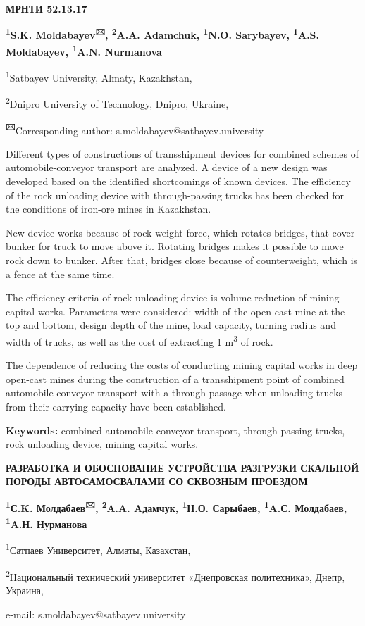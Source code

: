 \newpage
{\bfseries МРНТИ 52.13.17}


\begin{center}
{\bfseries \textsuperscript{1}S.K. Moldabayev\textsuperscript{🖂}, \textsuperscript{2}A.A. Adamchuk, \textsuperscript{1}N.O. Sarybayev, \textsuperscript{1}A.S. Moldabayev, \textsuperscript{1}A.N. Nurmanova}

\textsuperscript{1}Satbayev University, Almaty, Kazakhstan,

\textsuperscript{2}Dnipro University of Technology, Dnipro, Ukraine,

{\bfseries \textsuperscript{🖂}}Corresponding author:
s.moldabayev@satbayev.university
\end{center}

Different types of constructions of transshipment devices for combined
schemes of automobile-conveyor transport are analyzed. A device of a new
design was developed based on the identified shortcomings of known
devices. The efficiency of the rock unloading device with
through-passing trucks has been checked for the conditions of iron-ore
mines in Kazakhstan.

New device works because of rock weight force, which rotates bridges,
that cover bunker for truck to move above it. Rotating bridges makes it
possible to move rock down to bunker. After that, bridges close because
of counterweight, which is a fence at the same time.

The efficiency criteria of rock unloading device is volume reduction of
mining capital works. Parameters were considered: width of the open-cast
mine at the top and bottom, design depth of the mine, load capacity,
turning radius and width of trucks, as well as the cost of extracting 1
m\textsuperscript{3} of rock.

The dependence of reducing the costs of conducting mining capital works
in deep open-cast mines during the construction of a transshipment point
of combined automobile-conveyor transport with a through passage when
unloading trucks from their carrying capacity have been established.

{\bfseries Keywords:} combined automobile-conveyor transport,
through-passing trucks, rock unloading device, mining capital works.

\begin{center}
{\large\bfseries РАЗРАБОТКА И ОБОСНОВАНИЕ УСТРОЙСТВА РАЗГРУЗКИ СКАЛЬНОЙ ПОРОДЫ
АВТОСАМОСВАЛАМИ СО СКВОЗНЫМ ПРОЕЗДОМ}

{\bfseries \textsuperscript{1}С.K. Молдабаев\textsuperscript{🖂},
\textsuperscript{2}A.A. Aдамчук, \textsuperscript{1}Н.О. Сарыбаев,
\textsuperscript{1}A.С. Молдабаев, \textsuperscript{1}A.Н. Нурманова}

\textsuperscript{1}Сатпаев Университет, Алматы, Казахстан,

\textsuperscript{2}Национальный технический университет «Днепровская
политехника», Днепр, Украина,

e-mail: s.moldabayev@satbayev.university
\end{center}

